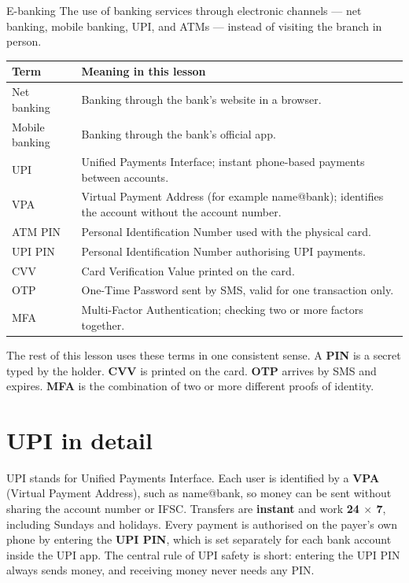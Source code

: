 \begin{definitionbox}{E-banking}
The use of banking services through electronic channels --- net banking,
mobile banking, UPI, and ATMs --- instead of visiting the branch in person.
\end{definitionbox}

\begin{center}
\begin{tabular}{p{}p{}}
\toprule
\textbf{Term} & \textbf{Meaning in this lesson} \\
\midrule
Net banking & Banking through the bank's website in a browser. \\
Mobile banking & Banking through the bank's official app. \\
UPI & Unified Payments Interface; instant phone-based payments between accounts. \\
VPA & Virtual Payment Address (for example name@bank); identifies the account without the account number. \\
ATM PIN & Personal Identification Number used with the physical card. \\
UPI PIN & Personal Identification Number authorising UPI payments. \\
CVV & Card Verification Value printed on the card. \\
OTP & One-Time Password sent by SMS, valid for one transaction only. \\
MFA & Multi-Factor Authentication; checking two or more factors together. \\
\bottomrule
\end{tabular}
\end{center}

The rest of this lesson uses these terms in one consistent sense. A
\textbf{PIN} is a secret typed by the holder. \textbf{CVV} is printed on the
card. \textbf{OTP} arrives by SMS and expires. \textbf{MFA} is the
combination of two or more different proofs of identity.

\section{UPI in detail}
UPI stands for Unified Payments Interface. Each user is identified by a
\textbf{VPA} (Virtual Payment Address), such as name@bank, so money can be
sent without sharing the account number or IFSC. Transfers are
\textbf{instant} and work \textbf{24 $\times$ 7}, including Sundays and
holidays. Every payment is authorised on the payer's own phone by entering
the \textbf{UPI PIN}, which is set separately for each bank account inside
the UPI app. The central rule of UPI safety is short: entering the UPI PIN
always sends money, and receiving money never needs any PIN.

